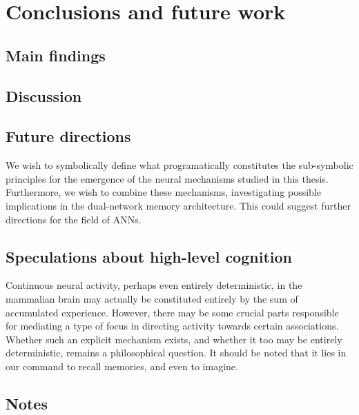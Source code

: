 
\chapter{Conclusions and future work}


\section{Main findings}



\section{Discussion}



\section{Future directions}

We wish to symbolically define what programatically constitutes the sub-symbolic principles for the emergence of the neural mechanisms studied in this thesis. Furthermore, we wish to combine these mechanisms, investigating possible implications in the dual-network memory architecture. This could suggest further directions for the field of ANNs.

\section{Speculations about high-level cognition}
Continuous neural activity, perhaps even entirely deterministic, in the mammalian brain may actually be constituted entirely by the sum of accumulated experience. However, there may be some crucial parts responsible for mediating a type of focus in directing activity towards certain associations. Whether such an explicit mechanism exists, and whether it too may be entirely deterministic, remains a philosophical question. It should be noted that it lies in our command to recall memories, and even to imagine.

\section{Notes}

